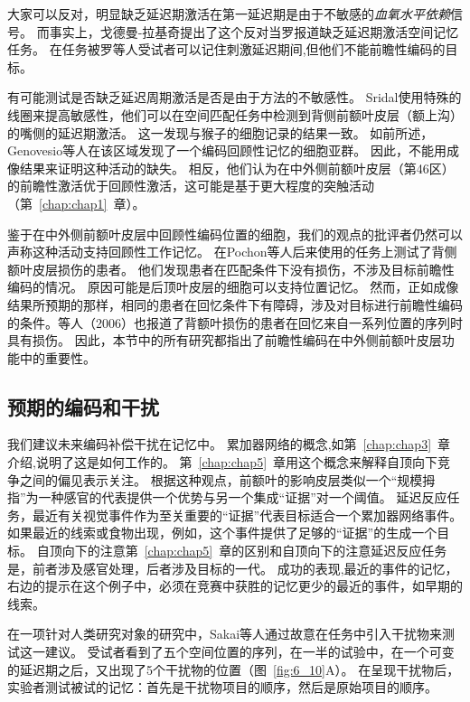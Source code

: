 大家可以反对，明显缺乏延迟期激活在第一延迟期是由于不敏感的\textit{血氧水平依赖}信号。
而事实上，戈德曼-拉基奇\cite{goldman2002functional}提出了这个反对当罗\cite{rowe2000prefrontal}报道缺乏延迟期激活空间记忆任务。
在任务被罗等人受试者可以记住刺激延迟期间,但他们不能前瞻性编码的目标。


有可能测试是否缺乏延迟周期激活是否是由于方法的不敏感性。
Sridal\cite{srimal2008persistent}使用特殊的线圈来提高敏感性，他们可以在空间匹配任务中检测到背侧前额叶皮层（额上沟）的嘴侧的延迟期激活。
这一发现与猴子的细胞记录的结果一致。
如前所述，Genovesio等人\cite{genovesio2006representation}在该区域发现了一个编码回顾性记忆的细胞亚群。
因此，不能用成像结果来证明这种活动的缺失。
相反，他们认为在中外侧前额叶皮层（第46区）的前瞻性激活优于回顾性激活，这可能是基于更大程度的突触活动（第~\ref{chap:chap1}~章）。



鉴于在中外侧前额叶皮层中回顾性编码位置的细胞，我们的观点的批评者仍然可以声称这种活动支持回顾性工作记忆。
在Pochon等人后来使用的任务上测试了背侧额叶皮层损伤的患者。
他们发现患者在匹配条件下没有损伤，不涉及目标前瞻性编码的情况。
原因可能是后顶叶皮层的细胞可以支持位置记忆。
然而，正如成像结果所预期的那样，相同的患者在回忆条件下有障碍，涉及对目标进行前瞻性编码的条件\cite{ferreira1998spatio}。等人（2006）也报道了背额叶损伤的患者在回忆来自一系列位置的序列时具有损伤。
因此，本节中的所有研究都指出了前瞻性编码在中外侧前额叶皮层功能中的重要性。



\subsection{预期的编码和干扰}

我们建议未来编码补偿干扰在记忆中。
累加器网络的概念,如第~\ref{chap:chap3}~章介绍,说明了这是如何工作的。
第~\ref{chap:chap5}~章用这个概念来解释自顶向下竞争之间的偏见表示关注。
根据这种观点，前额叶的影响皮层类似一个“规模拇指”为一种感官的代表提供一个优势与另一个集成“证据”对一个阈值。
延迟反应任务，最近有关视觉事件作为至关重要的“证据”代表目标适合一个累加器网络事件。
如果最近的线索或食物出现，例如，这个事件提供了足够的“证据”的生成一个目标。
自顶向下的注意第~\ref{chap:chap5}~章的区别和自顶向下的注意延迟反应任务是，前者涉及感官处理，后者涉及目标的一代。
成功的表现,最近的事件的记忆，右边的提示在这个例子中，必须在竞赛中获胜的记忆更少的最近的事件，如早期的线索。


在一项针对人类研究对象的研究中，Sakai等人\cite{sakai2002active}通过故意在任务中引入干扰物来测试这一建议。
受试者看到了五个空间位置的序列，在一半的试验中，在一个可变的延迟期之后，又出现了5个干扰物的位置（图~\ref{fig:6_10}A）。
在呈现干扰物后，实验者测试被试的记忆：首先是干扰物项目的顺序，然后是原始项目的顺序。


